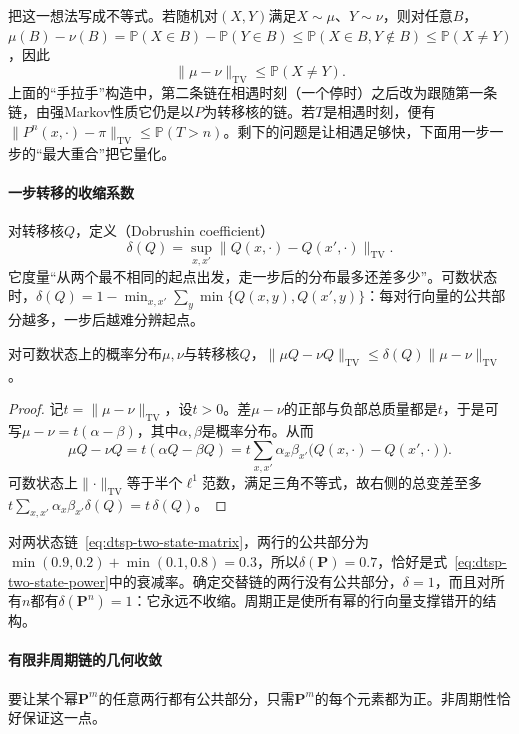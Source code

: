 把这一想法写成不等式。若随机对$(X,Y)$满足$X\sim\mu$、$Y\sim\nu$，则对任意$B$，$\mu(B)-\nu(B)=\mathbb P(X\in B)-\mathbb P(Y\in B)\leq\mathbb P(X\in B,Y\notin B)\leq\mathbb P(X\neq Y)$，因此
\begin{equation}
  \lVert\mu-\nu\rVert_{\mathrm{TV}}\leq\mathbb P(X\neq Y).
  \label{eq:dtsp-coupling-inequality}
\end{equation}
上面的“手拉手”构造中，第二条链在相遇时刻（一个停时）之后改为跟随第一条链，由强Markov性质它仍是以$P$为转移核的链。若$T$是相遇时刻，便有$\lVert P^n(x,\cdot)-\pi\rVert_{\mathrm{TV}}\leq\mathbb P(T>n)$。剩下的问题是让相遇足够快，下面用一步一步的“最大重合”把它量化。

\paragraph{一步转移的收缩系数}
对转移核$Q$，定义（Dobrushin coefficient）
\[
  \delta(Q)=\sup_{x,x'}\lVert Q(x,\cdot)-Q(x',\cdot)\rVert_{\mathrm{TV}}.
\]
它度量“从两个最不相同的起点出发，走一步后的分布最多还差多少”。可数状态时，$\delta(Q)=1-\min_{x,x'}\sum_y\min\{Q(x,y),Q(x',y)\}$：每对行向量的公共部分越多，一步后越难分辨起点。

\begin{lemma}[总变差的收缩]
  \label{lem:dtsp-dobrushin}
  对可数状态上的概率分布$\mu,\nu$与转移核$Q$，$\lVert\mu Q-\nu Q\rVert_{\mathrm{TV}}\leq\delta(Q)\lVert\mu-\nu\rVert_{\mathrm{TV}}$。
\end{lemma}

\begin{proof}
记$t=\lVert\mu-\nu\rVert_{\mathrm{TV}}$，设$t>0$。差$\mu-\nu$的正部与负部总质量都是$t$，于是可写$\mu-\nu=t(\alpha-\beta)$，其中$\alpha,\beta$是概率分布。从而
\[
  \mu Q-\nu Q=t(\alpha Q-\beta Q)=t\sum_{x,x'}\alpha_x\beta_{x'}\bigl(Q(x,\cdot)-Q(x',\cdot)\bigr).
\]
可数状态上$\lVert\cdot\rVert_{\mathrm{TV}}$等于半个$\ell^1$范数，满足三角不等式，故右侧的总变差至多$t\sum_{x,x'}\alpha_x\beta_{x'}\delta(Q)=t\,\delta(Q)$。
\end{proof}

对两状态链~\eqref{eq:dtsp-two-state-matrix}，两行的公共部分为$\min(0.9,0.2)+\min(0.1,0.8)=0.3$，所以$\delta(\bm P)=0.7$，恰好是式~\eqref{eq:dtsp-two-state-power}中的衰减率。确定交替链的两行没有公共部分，$\delta=1$，而且对所有$n$都有$\delta(\bm P^n)=1$：它永远不收缩。周期正是使所有幂的行向量支撑错开的结构。

\paragraph{有限非周期链的几何收敛}
要让某个幂$\bm P^m$的任意两行都有公共部分，只需$\bm P^m$的每个元素都为正。非周期性恰好保证这一点。

